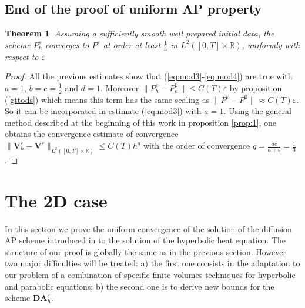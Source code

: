 \documentclass[a4paper,french,english,10pt]{article}
\newcommand\eps{\varepsilon}
\newtheorem{theorem}{Theorem}[section]
\begin{document}
\subsection{End of the proof of uniform AP property}


\begin{theorem} \label{theor:1d}
Assuming a sufficiently smooth well prepared initial data,
the scheme $P_h^\eps$ converges to $P^\eps$ at order at least 
$\frac13$ in $L^2([0,T]\times \mathbb{R}   )$, uniformly with respect to $\eps$
\end{theorem}
\begin{proof}
All the previous estimates
show that (\ref{eq:mod3}-\ref{eq:mod4})  are true
with
$a=1$, $b=c=\frac12$ and $d=1$.
Moreover $\|P_h^\varepsilon-P_h^0  \|\leq C(T) \eps $
by proposition (\ref{gttods}) which means this term has the same
scaling as $\|P^\varepsilon-P^0  \|\approx C(T) \eps$.
So it can be  incorporated 
in  estimate (\ref{eq:mod3}) with $a=1$.
Using the general
method described at the beginning of this work in proposition \ref{prop:1}, 
one  obtains the convergence
estimate of convergence
$
\|\mathbf V_h^\eps -\mathbf V^\eps   \|_{L^2([0,T]\times \mathbb{R}   )  }
\leq C(T) h^{ q }
$
with the order of convergence
$
q=\frac{ac}{a+b}=\frac13$.
\end{proof} 

\section{The 2D case}

In this section we prove the uniform 
convergence of the solution of the diffusion
AP 
 scheme introduced in \cite{glaceap} to the solution
of the hyperbolic heat equation.
The structure of our proof  
is globally the same
as in the previous section. However two major  difficulties
will be treated: a) the first one 
consists in  the adaptation to our problem
 of a  combination of specific finite volumes 
techniques for hyperbolic and parabolic equations;
b) the second one is to derive new bounds for the scheme $\mathbf{DA}_h^\eps$.
\end{document}
